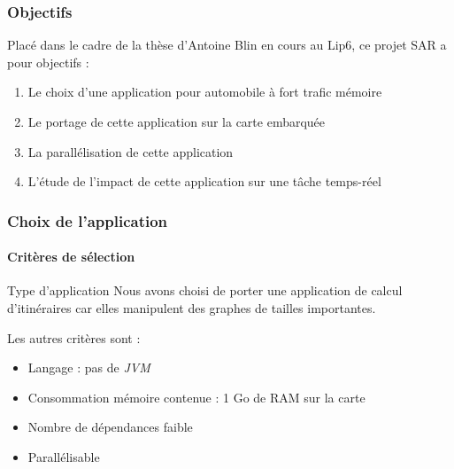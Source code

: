 \begin{frame}
  \frametitle{Objectifs}
  Placé dans le cadre de la thèse d'Antoine Blin en cours au Lip6, ce projet SAR
  a pour objectifs :
  \vspace{1em}
  \begin{enumerate}
  \item Le choix d'une application pour automobile à fort trafic mémoire
    \vspace{1em}
  \item Le portage de cette application sur la carte embarquée
    \vspace{1em}
  \item La parallélisation de cette application
    \vspace{1em}
  \item L'étude de l'impact de cette application sur une tâche temps-réel
  \end{enumerate}
\end{frame}

\begin{frame}
  \frametitle{Choix de l'application}
  \framesubtitle{Critères de sélection}
  \begin{block}{Type d'application}
    Nous avons choisi de porter une application de calcul d'itinéraires car elles
    manipulent des graphes de tailles importantes.
  \end{block}
  Les autres critères sont :
  \begin{itemize}
  \item Langage : pas de \textit{JVM}
    \vspace{1em}
  \item Consommation mémoire contenue : 1 Go de RAM sur la carte
    \vspace{1em}
  \item Nombre de dépendances faible
    \vspace{1em}
  \item Parallélisable
  \end{itemize}
\end{frame}

